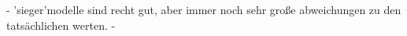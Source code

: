 - 'sieger'modelle sind recht gut, aber immer noch sehr große abweichungen zu den tatsächlichen werten.
- 